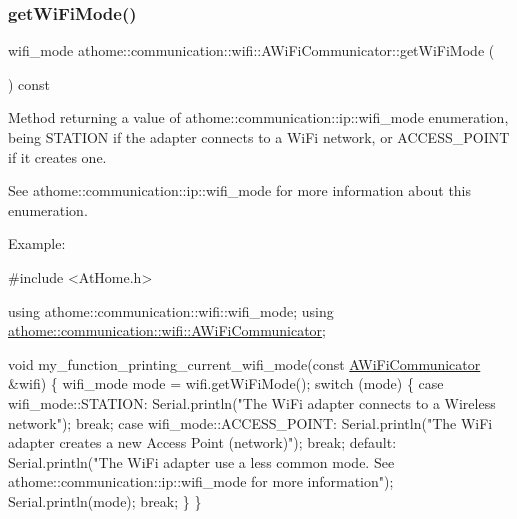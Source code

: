 \subsubsection{\texorpdfstring{get\+Wi\+Fi\+Mode()}{getWiFiMode()}}
{\footnotesize\ttfamily wifi\+\_\+mode athome\+::communication\+::wifi\+::\+A\+Wi\+Fi\+Communicator\+::get\+Wi\+Fi\+Mode (\begin{DoxyParamCaption}{ }\end{DoxyParamCaption}) const}

Method returning a value of athome\+::communication\+::ip\+::wifi\+\_\+mode enumeration, being S\+T\+A\+T\+I\+ON if the adapter connects to a Wi\+Fi network, or A\+C\+C\+E\+S\+S\+\_\+\+P\+O\+I\+NT if it creates one.

See athome\+::communication\+::ip\+::wifi\+\_\+mode for more information about this enumeration.

Example\+:


\begin{DoxyCode}
\textcolor{preprocessor}{#include <AtHome.h>}

\textcolor{keyword}{using} athome::communication::wifi::wifi\_mode;
\textcolor{keyword}{using} \mbox{\hyperlink{classathome_1_1communication_1_1wifi_1_1_a_wi_fi_communicator}{athome::communication::wifi::AWiFiCommunicator}};

\textcolor{keywordtype}{void} my\_function\_printing\_current\_wifi\_mode(\textcolor{keyword}{const} \mbox{\hyperlink{classathome_1_1communication_1_1wifi_1_1_a_wi_fi_communicator_a0098148fe8d0eeee99b7f8f72a72a900}{AWiFiCommunicator}} &wifi) \{
  wifi\_mode mode = wifi.getWiFiMode();
  \textcolor{keywordflow}{switch} (mode) \{
    \textcolor{keywordflow}{case} wifi\_mode::STATION:
      Serial.println(\textcolor{stringliteral}{"The WiFi adapter connects to a Wireless network"});
      \textcolor{keywordflow}{break};
    \textcolor{keywordflow}{case} wifi\_mode::ACCESS\_POINT:
      Serial.println(\textcolor{stringliteral}{"The WiFi adapter creates a new Access Point (network)"});
      \textcolor{keywordflow}{break};
    \textcolor{keywordflow}{default}:
      Serial.println(\textcolor{stringliteral}{"The WiFi adapter use a less common mode. See athome::communication::ip::wifi\_mode for
       more information"});
      Serial.println(mode);
      \textcolor{keywordflow}{break};
  \}
\}
\end{DoxyCode}
 \mbox{\label{classathome_1_1communication_1_1wifi_1_1_a_wi_fi_communicator_a578087d01c814481d89ea702a6d7ed01}} 
